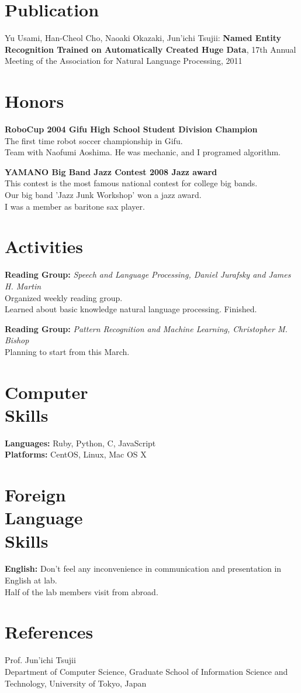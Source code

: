 \documentclass[margin]{res}
\begin{document}
\begin{resume}
\section{Publication}
Yu Usami, Han-Cheol Cho, Naoaki Okazaki, Jun'ichi Tsujii: \textbf{Named Entity Recognition Trained on Automatically Created Huge Data}, 17th Annual Meeting of the Association for Natural Language Processing, 2011 

\section{Honors}
\textbf{RoboCup 2004 Gifu High School Student Division Champion} \\
The first time robot soccer championship in Gifu. \\
Team with Naofumi Aoshima. He was mechanic, and I programed algorithm.

\textbf{YAMANO Big Band Jazz Contest 2008 Jazz award} \\
This contest is the most famous national contest for college big bands.\\
Our big band 'Jazz Junk Workshop' won a jazz award. \\
I was a member as baritone sax player.

\section{Activities}
\textbf{Reading Group:} {\sl Speech and Language Processing, Daniel Jurafsky and James H. Martin} \\
Organized weekly reading group. \\
Learned about basic knowledge natural language processing. Finished.

\textbf{Reading Group:} {\sl Pattern Recognition and Machine Learning, Christopher M. Bishop} \\
Planning to start from this March.

\section{Computer \\ Skills}
\textbf{Languages:} Ruby, Python, C, JavaScript \\
\textbf{Platforms:} CentOS, Linux, Mac OS X \\ 

\section{Foreign \\ Language \\ Skills}
\textbf{English:} Don't feel any inconvenience in communication and presentation in English at lab.\\
Half of the lab members visit from abroad. 

\section{References} 
Prof. Jun'ichi Tsujii \\
Department of Computer Science, Graduate School of Information Science and Technology, University of Tokyo, Japan
\end{resume}
\end{document}
